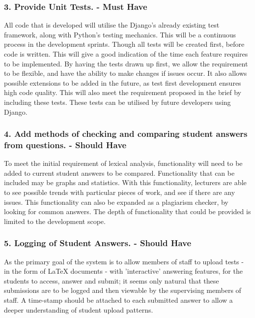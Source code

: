 	\subsubsection*{3. Provide Unit Tests. - Must Have}
	All code that is developed will utilise the Django’s already existing test framework, along with Python’s testing mechanics. This will be a continuous process in the development sprints. Though all tests will be created first, before code is written. This will give a good indication of the time each feature requires to be implemented. By having the tests drawn up first, we allow the requirement to be flexible, and have the ability to make changes if issues occur. It also allows possible extensions to be added in the future, as test first development ensures high code quality. This will also meet the requirement proposed in the brief by including these tests. These tests can be utilised by future developers using Django.
	
	
	\subsubsection*{4. Add methods of checking and comparing student answers from questions. - Should Have}
	To meet the initial requirement of lexical analysis, functionality will need to be added to current student answers to be compared. Functionality that can be included may be graphs and statistics. With this functionality, lecturers are able to see possible trends with particular pieces of work, and see if there are any issues. This functionality can also be expanded as a plagiarism checker, by looking for common answers. The depth of functionality that could be provided is limited to the development scope.
    
	\subsubsection*{5. Logging of Student Answers. - Should Have}
	As the primary goal of the system is to allow members of staff to upload tests - in the form of LaTeX documents - with 'interactive' answering features, for the students to access, answer and submit; it seems only natural that these submissions are to be logged and then viewable by the supervising members of staff. A time-stamp should be attached to each submitted answer to allow a deeper understanding of student upload patterns.
	
